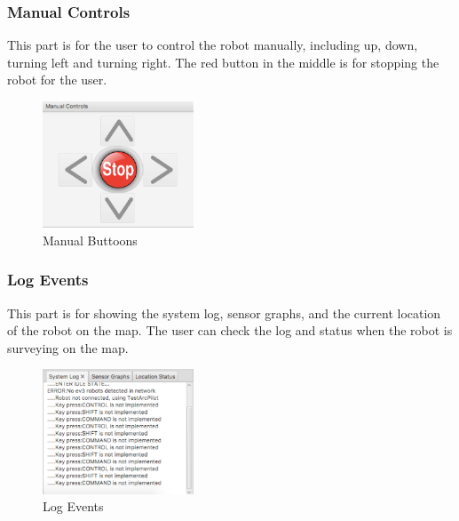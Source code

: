 \documentclass[10pt,a4paper,titlepage]{article}
\begin{document}
  \subsubsection{  Manual Controls} 
This part is for the user to control the robot manually, including up, down, turning left and turning right. The red button in the middle is for stopping the robot for the user.  \begin{figure}[H] 
  \includegraphics[width=0.4\textwidth]{buttons.png}  %
  \caption{Manual Buttoons} 
  \label{fig:Manual Buttoons}               
  \end{figure} 
   
   
  \subsubsection{Log Events} 
This part is for showing the system log, sensor graphs, and the current location of the robot on the map. The user can check the log and status when the robot is surveying on the map.  \begin{figure}[H] 
  \includegraphics[width=0.4\textwidth]{log.png}  %
  \caption{Log Events} 
  \label{fig:Log Events}               
  \end{figure} 
   
   
\end{document}
